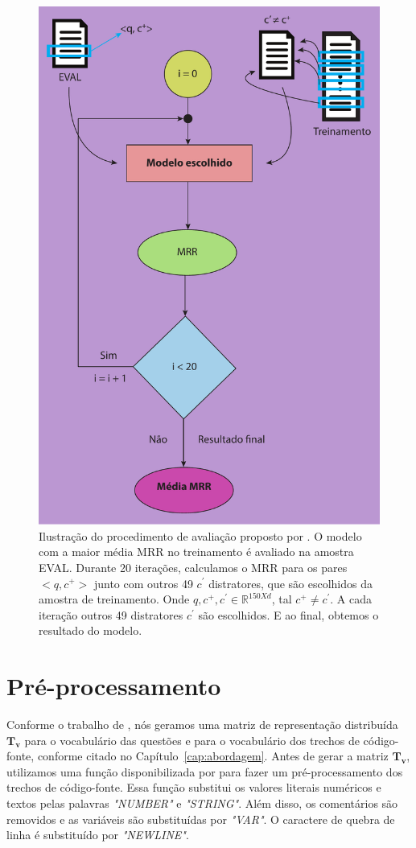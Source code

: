 \begin{figure}[h]
\centering
\includegraphics[height=1\textwidth]{figuras/cap-experimento/final_evaluation_process.pdf}
\caption{Ilustração do procedimento de avaliação proposto por \cite{iyer-etal-2016-summarizing}. O modelo com a maior média MRR no treinamento é avaliado na amostra EVAL. Durante 20 iterações, calculamos o MRR para os pares $<q, c^{+}>$ junto com outros 49 $c^{'}$ distratores, que são escolhidos da amostra de treinamento. Onde $q, c^{+}, c^{'} \in \mathbb{R}^{150 X d}$, tal $c^{+} \neq c^{'}$. A cada iteração outros 49 distratores $c^{'}$ são escolhidos. E ao final, obtemos o resultado do modelo.}
\label{fig:final-evaluation-process}
\end{figure}

\section{Pré-processamento}
\label{sec:pre-processamento}

Conforme o trabalho de \cite{tan-lstm-qa}, nós geramos uma matriz de representação distribuída $\bm{T_{v}}$ para o vocabulário das questões e para o vocabulário dos trechos de código-fonte, conforme citado no Capítulo~\ref{cap:abordagem}. Antes de gerar a matriz $\bm{T_{v}}$, utilizamos uma função disponibilizada por \cite{yao-2018} para fazer um pré-processamento dos trechos de código-fonte. Essa função substitui os valores literais numéricos e textos pelas palavras \emph{"NUMBER"} e \emph{"STRING"}. Além disso, os comentários são removidos e as variáveis são substituídas por \emph{"VAR"}. O caractere de quebra de linha é substituído por \emph{"NEWLINE"}.

